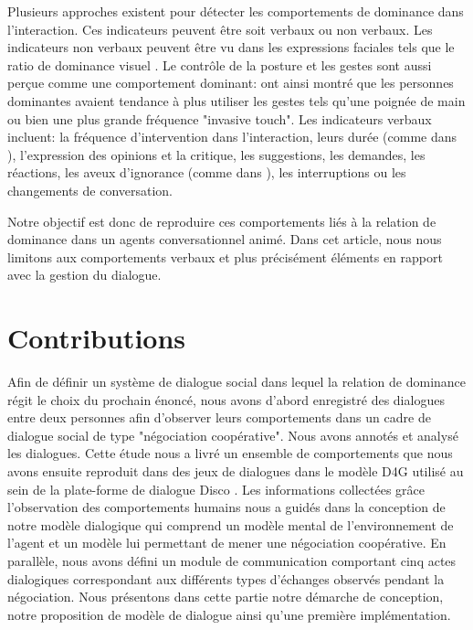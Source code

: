 \documentclass [french]{sig-alternate-05-2015}
\begin{document}
\par Plusieurs approches existent pour détecter les comportements de dominance dans l'interaction. Ces indicateurs peuvent être soit verbaux ou non verbaux. Les indicateurs non verbaux peuvent être vu dans les expressions faciales tels que le ratio de dominance visuel \cite{dunbar2005perceptions}. Le contrôle de la posture et les gestes sont aussi perçue comme une comportement dominant: \cite{hall2005nonverbal} ont ainsi montré que les personnes dominantes avaient tendance à plus utiliser les gestes tels qu'une poignée de main ou bien une plus grande fréquence "invasive touch". Les indicateurs verbaux incluent: la fréquence d'intervention dans l'interaction, leurs durée (comme dans  \cite{dunbar2005perceptions}), l’expression des opinions
et la critique, les suggestions, les demandes, les réactions, les aveux d'ignorance (comme dans \cite{zablotskaya2012relating}), les interruptions ou les
changements de conversation.

Notre objectif est donc de reproduire ces comportements liés à la relation de dominance dans un agents conversationnel animé. Dans cet article, nous nous limitons aux comportements verbaux et plus précisément éléments en rapport avec la gestion du dialogue.

\section{Contributions}
\label{contribution}

\par Afin de définir un système de dialogue social dans lequel la relation de dominance régit le choix du prochain énoncé, nous avons d'abord enregistré des dialogues entre deux personnes afin d'observer leurs comportements dans un cadre de dialogue social de type "négociation coopérative". Nous avons annotés et analysé les dialogues. Cette étude nous a livré un ensemble de comportements  que nous avons ensuite reproduit dans des jeux de dialogues dans le modèle D4G utilisé au sein de la plate-forme de dialogue Disco \cite{rich2009building}. 
 Les informations collectées grâce l'observation des comportements humains nous a guidés dans la conception de notre modèle dialogique qui comprend un modèle mental de l'environnement de l'agent et un modèle lui permettant de mener une négociation coopérative. 
En parallèle, nous avons défini un module de communication comportant cinq actes dialogiques correspondant aux différents types d'échanges observés pendant la négociation. Nous présentons dans cette partie notre démarche de conception, notre proposition de modèle de dialogue ainsi qu'une première implémentation.
\end{document}
